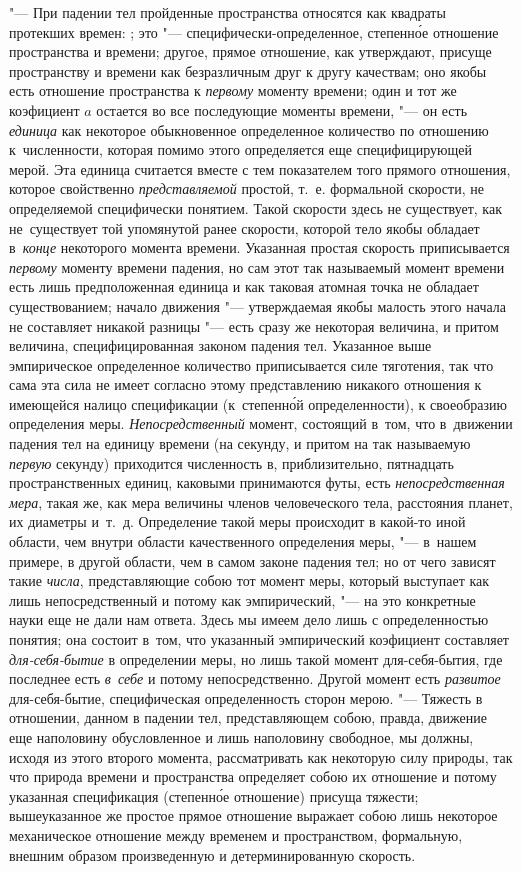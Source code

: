 "--- При падении тел пройденные пространства относятся как квадраты протекших
времен: ; это "--- специфически-определенное, степенн\'{о}е отношение
пространства и времени; другое, прямое отношение, как утверждают, присуще
пространству и времени как безразличным друг к другу качествам; оно якобы есть
отношение пространства к {\em первому} моменту времени; один и тот же
коэфициент $a$ остается во все последующие моменты времени, "--- он есть
{\em единица} как некоторое обыкновенное определенное количество по отношению
к~численности, которая помимо этого определяется еще специфицирующей мерой. Эта
единица считается вместе с тем показателем того прямого отношения, которое
свойственно {\em представляемой} простой, т.~е. формальной скорости, не
определяемой специфически понятием. Такой скорости здесь не существует, как
не~существует той упомянутой ранее скорости, которой тело якобы обладает
в~{\em конце} некоторого момента времени. Указанная простая скорость
приписывается {\em первому} моменту времени падения, но сам этот так называемый
момент времени есть лишь предположенная единица и как таковая атомная точка не
обладает существованием; начало движения "--- утверждаемая якобы малость этого
начала не составляет никакой разницы "--- есть сразу же некоторая величина, и
притом величина, специфицированная законом падения тел. Указанное выше
эмпирическое определенное количество приписывается силе тяготения, так что сама
эта сила не имеет согласно этому представлению никакого отношения к имеющейся
налицо спецификации (к~степенн\'{о}й определенности), к своеобразию определения
меры. {\em Непосредственный} момент, состоящий в~том, что в~движении падения
тел на единицу времени (на секунду, и притом на так называемую {\em первую}
секунду) приходится численность в, приблизительно, пятнадцать пространственных
единиц, каковыми принимаются футы, есть {\em непосредственная мера}, такая же,
как мера величины членов человеческого тела, расстояния планет, их диаметры
и~т.~д. Определение такой меры происходит в какой-то иной области, чем внутри
области качественного определения меры, "--- в~нашем примере, в другой области,
чем в самом законе падения тел; но от чего зависят такие {\em числа},
представляющие собою тот момент меры, который выступает как лишь
непосредственный и потому как эмпирический, "--- на это конкретные науки еще не
дали нам ответа. Здесь мы имеем дело лишь с определенностью понятия; она
состоит в~том, что указанный эмпирический коэфициент составляет
{\em для-себя-бытие} в определении меры, но лишь такой момент для-себя-бытия,
где последнее есть {\em в~себе} и потому непосредственно. Другой момент есть
{\em развитое} для-себя-бытие, специфическая определенность сторон мерою. "---
Тяжесть в отношении, данном в падении тел, представляющем собою, правда,
движение еще наполовину обусловленное и лишь наполовину свободное, мы должны,
исходя из этого второго момента, рассматривать как некоторую силу природы, так
что природа времени и пространства определяет собою их отношение и потому
указанная спецификация (степенн\'{о}е отношение) присуща тяжести; вышеуказанное
же простое прямое отношение выражает собою лишь некоторое механическое
отношение между временем и пространством, формальную, внешним образом
произведенную и детерминированную скорость.

